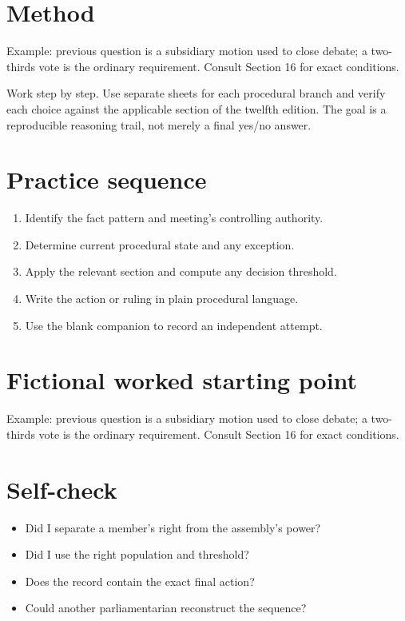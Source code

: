 \documentclass[11pt]{article}
\begin{document}
\SuiteOpen
\section{Method}
Example: previous question is a subsidiary motion used to close debate; a two-thirds vote is the ordinary requirement. Consult Section 16 for exact conditions.

Work step by step. Use separate sheets for each procedural branch and verify each choice against the applicable section of the twelfth edition. The goal is a reproducible reasoning trail, not merely a final yes/no answer.

\section{Practice sequence}
\begin{enumerate}[leftmargin=*,itemsep=4pt]
\item Identify the fact pattern and meeting’s controlling authority.
\item Determine current procedural state and any exception.
\item Apply the relevant section and compute any decision threshold.
\item Write the action or ruling in plain procedural language.
\item Use the blank companion to record an independent attempt.
\end{enumerate}

\section{Fictional worked starting point}
Example: previous question is a subsidiary motion used to close debate; a two-thirds vote is the ordinary requirement. Consult Section 16 for exact conditions.

\section{Self-check}
\begin{itemize}[leftmargin=*,itemsep=4pt]
\item Did I separate a member’s right from the assembly’s power?
\item Did I use the right population and threshold?
\item Does the record contain the exact final action?
\item Could another parliamentarian reconstruct the sequence?
\end{itemize}
\end{document}
